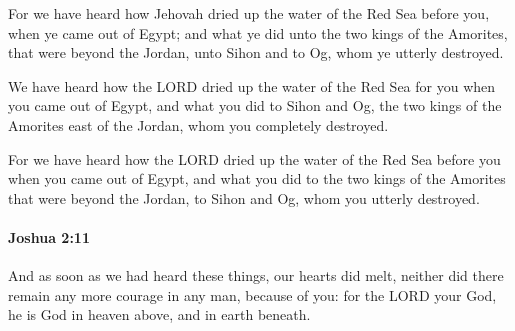 			\begin{versebox}
					\item[BHS] 
					\item[ASV] For we have heard how Jehovah dried up the water of the Red Sea before you, when ye came out of Egypt; and what ye did unto the two kings of the Amorites, that were beyond the Jordan, unto Sihon and to Og, whom ye utterly destroyed.
					\item[NIV] We have heard how the LORD dried up the water of the Red Sea for you when you came out of Egypt, and what you did to Sihon and Og, the two kings of the Amorites east of the Jordan, whom you completely destroyed.
					\item[NRSV] For we have heard how the LORD dried up the water of the Red Sea before you when you came out of Egypt, and what you did to the two kings of the Amorites that were beyond the Jordan, to Sihon and Og, whom you utterly destroyed.
			\end{versebox}

		\paragraph{Joshua 2:11} %
			\label{JOSHUA-2-11}

			And as soon as we had heard these things, our hearts did melt, neither did there remain any more courage in any man, because of you: for the LORD your God, he is God in heaven above, and in earth beneath.

